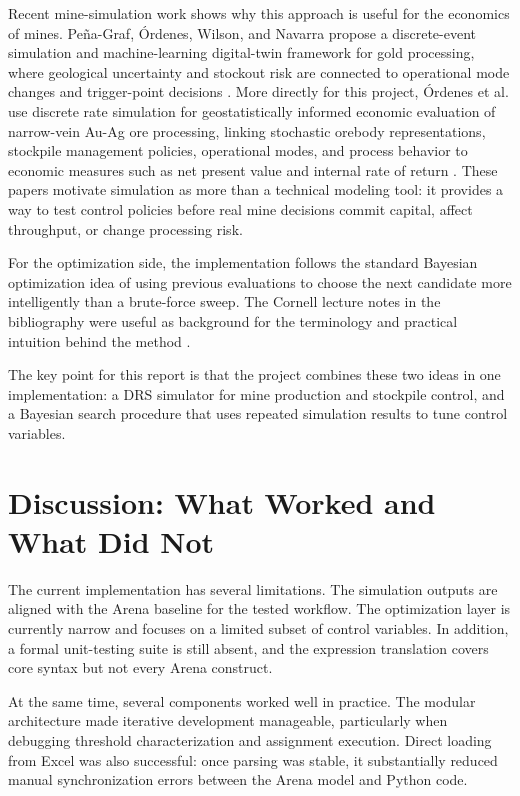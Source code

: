 \documentclass[11pt]{article}
\begin{document}
Recent mine-simulation work shows why this approach is useful for the economics of mines. Pe{\~n}a-Graf, {\'O}rdenes, Wilson, and Navarra propose a discrete-event simulation and machine-learning digital-twin framework for gold processing, where geological uncertainty and stockout risk are connected to operational mode changes and trigger-point decisions \cite{penagraf2022desml}. More directly for this project, {\'O}rdenes et al. use discrete rate simulation for geostatistically informed economic evaluation of narrow-vein Au-Ag ore processing, linking stochastic orebody representations, stockpile management policies, operational modes, and process behavior to economic measures such as net present value and internal rate of return \cite{ordenes2025drs}. These papers motivate simulation as more than a technical modeling tool: it provides a way to test control policies before real mine decisions commit capital, affect throughput, or change processing risk.

For the optimization side, the implementation follows the standard Bayesian optimization idea of using previous evaluations to choose the next candidate more intelligently than a brute-force sweep. The Cornell lecture notes in the bibliography were useful as background for the terminology and practical intuition behind the method \cite{cornell4780note15,cornell4787lec16,cornell4787lec17}.

The key point for this report is that the project combines these two ideas in one implementation: a DRS simulator for mine production and stockpile control, and a Bayesian search procedure that uses repeated simulation results to tune control variables.

\section{Discussion: What Worked and What Did Not}
The current implementation has several limitations. The simulation outputs are aligned with the Arena baseline for the tested workflow. The optimization layer is currently narrow and focuses on a limited subset of control variables. In addition, a formal unit-testing suite is still absent, and the expression translation covers core syntax but not every Arena construct.

At the same time, several components worked well in practice. The modular architecture made iterative development manageable, particularly when debugging threshold characterization and assignment execution. Direct loading from Excel was also successful: once parsing was stable, it substantially reduced manual synchronization errors between the Arena model and Python code.
\end{document}
